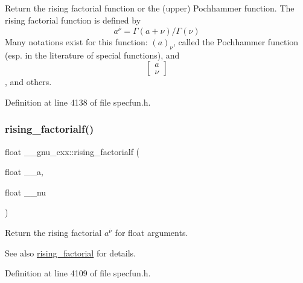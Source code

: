 Return the rising factorial function or the (upper) Pochhammer function. The rising factorial function is defined by \[ a^{\overline{\nu}} = \Gamma(a + \nu) / \Gamma(\nu) \] Many notations exist for this function\+: $ (a)_\nu $, called the Pochhammer function (esp. in the literature of special functions), and \[ \left[ \begin{array}{c} a \\ \nu \end{array} \right] \], and others. 



Definition at line 4138 of file specfun.\+h.

\mbox{\label{group__mathsf__gnu_ga10da05b995a42f0b0625e61186af7449}} 
\subsubsection{\texorpdfstring{rising\+\_\+factorialf()}{rising\_factorialf()}}
{\footnotesize\ttfamily float \+\_\+\+\_\+gnu\+\_\+cxx\+::rising\+\_\+factorialf (\begin{DoxyParamCaption}\item[{float}]{\+\_\+\+\_\+a,  }\item[{float}]{\+\_\+\+\_\+nu }\end{DoxyParamCaption})\hspace{0.3cm}{\ttfamily [inline]}}

Return the rising factorial $ a^{\overline{\nu}} $ for float arguments.

\begin{DoxySeeAlso}{See also}
\hyperlink{group__mathsf__gnu_gae8c36a0e1f60254cf212a3806f7c675c}{rising\+\_\+factorial} for details. 
\end{DoxySeeAlso}


Definition at line 4109 of file specfun.\+h.

\mbox{\label{group__mathsf__gnu_gac9a399ae01c315aa78a64b445795d974}} 
